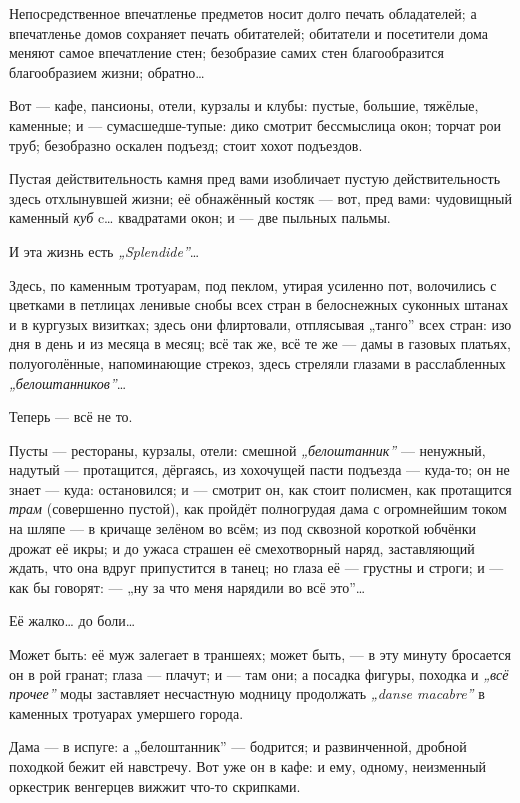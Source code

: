 \documentclass[12pt,a4paper,oneside]{book}
\begin{document}
Непосредственное впечатленье предметов носит долго печать обладателей; а впечатленье домов сохраняет печать обитателей; обитатели и посетители дома меняют самое впечатление стен; безобразие самих стен благообразится благообразием жизни; обратно…

Вот — кафе, пансионы, отели, курзалы и клубы: пустые, большие, тяжёлые, каменные; и — сумасшедше-тупые: дико смотрит бессмыслица окон; торчат рои труб; безобразно оскален подъезд; стоит хохот подъездов.

Пустая действительность камня пред вами изобличает пустую действительность здесь отхлынувшей жизни; её обнажённый костяк — вот, пред вами: чудовищный каменный \emph{куб} c… квадратами окон; и — две пыльных пальмы.

И эта жизнь есть \emph{„Splendide”}…

Здесь, по каменным тротуарам, под пеклом, утирая усиленно пот, волочились с цветками в петлицах ленивые снобы всех стран в белоснежных суконных штанах и в кургузых визитках; здесь они флиртовали, отплясывая „танго” всех стран: изо дня в день и из месяца в месяц; всё так же, всё те же — дамы в газовых платьях, полуоголённые, напоминающие стрекоз, здесь стреляли глазами в расслабленных \emph{„белоштанников”}…

Теперь — всё не то.

Пусты — рестораны, курзалы, отели: смешной \emph{„белоштанник”} — ненужный, надутый — протащится, дёргаясь, из хохочущей пасти подъезда — куда-то; он не знает — куда: остановился; и — смотрит он, как стоит полисмен, как протащится \emph{трам} (совершенно пустой), как пройдёт полногрудая дама с огромнейшим током на шляпе — в кричаще зелёном во всём; из под сквозной короткой юбчёнки дрожат её икры; и до ужаса страшен её смехотворный наряд, заставляющий ждать, что она вдруг припустится в танец; но глаза её — грустны и строги; и — как бы говорят: — „ну за что меня нарядили во всё это”…

Её жалко… до боли…

Может быть: её муж залегает в траншеях; может быть, — в эту минуту бросается он в рой гранат; глаза — плачут; и — там они; а посадка фигуры, походка и \emph{„всё прочее”} моды заставляет несчастную модницу продолжать \emph{„danse macabre”} в каменных тротуарах умершего города.

Дама — в испуге: а „белоштанник” — бодрится; и развинченной, дробной походкой бежит ей навстречу. Вот уже он в кафе: и ему, одному, неизменный оркестрик венгерцев вижжит что-то скрипками.
\end{document}
